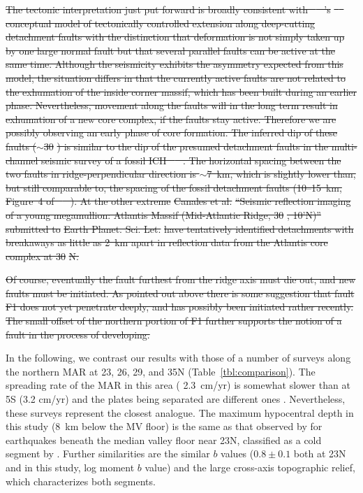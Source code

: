 \documentclass[jgrga]{agu2001} %
\newlength{\tw}
\providecommand{\DIFdel}[1]{{\protect\color{red}\sout{#1}}}                      %
\providecommand{\DIFdelbegin}{} %
\providecommand{\DIFdelend}{} %
\begin{document}
\begin{article}
\DIFdelbegin \DIFdel{The tectonic interpretation just put forward is broadly consistent
with \mbox{%
\citeauthor{tucholke94}
}%
's }%
\DIFdel{\mbox{%
\citeyear{tucholke94}
}%
}%
\DIFdel{conceptual
model of tectonically controlled extension along deep-cutting
detachment faults with the distinction that deformation is
not simply taken up by one large normal fault  but that several
parallel faults can be active at the same time.
Although the seismicity exhibits the asymmetry expected from this
model, the situation differs in that the currently active faults are
not related to the exhumation of the inside corner massif, which has
been built during an earlier phase. Nevertheless, movement along the
faults will in the long term result in exhumation of a new core
complex, if the faults stay active. Therefore we are possibly 
observing an early phase of core formation.
The inferred dip of
these faults ($\sim$30}%
\DIFdel{) is similar to the dip of the presumed
detachment faults in the multi-channel seismic survey of a fossil ICH
\mbox{%
\citep{ranero99}
}%
.  The horizontal spacing between the two faults in
ridge-perpendicular direction is $\sim$7~km, which is slightly lower
than, but still comparable to, the spacing of the fossil detachment
faults (10--15~km, Figure~4 of \mbox{%
\citet{ranero99}
}%
). At the other extreme
}%
\DIFdel{Canales et al.}%
\DIFdel{``Seismic reflection imaging of a young
megamullion: Atlantis Massif (Mid-Atlantic Ridge, 30}%
\DIFdel{, 10'N)'' submitted to }%
\DIFdel{Earth Planet. Sci. Let.}%
\DIFdel{have tentatively identified detachments with breakaways as little as
2~km apart in reflection data from the Atlantis core complex at 30}%
\DIFdel{N.
}\DIFdelend %


\DIFdelbegin \DIFdel{Of course, eventually the fault furthest
from the ridge axis must die out, and new faults must be
initiated. As pointed out above there is some suggestion that fault
F1 does not yet penetrate deeply, and has possibly been initiated
rather recently. The small offset of the northern portion of F1
further supports the notion of a fault in the process of developing.
}%

\DIFdelend In the following, we contrast our results with those of a number of
surveys along the northern MAR at 23\dg, 26\dg, 29\dg,  and 35\dg N (Table~\ref{tbl:comparison}).  The spreading
rate of the MAR in this area ( 2.3~cm/yr) is somewhat slower than
at 5\dg S (3.2 cm/yr) and the plates being separated are different
ones \citep{demets94}.
Nevertheless, these surveys represent the closest analogue.
The maximum hypocentral depth in this study (8~km below the MV
floor) is the same as that
observed by \citet{toomey88} for earthquakes beneath the median valley
floor near 23\dg N, classified as a cold segment by \citet{thibaud98}. Further similarities are the
similar $b$ values ($0.8\pm0.1$ both at 23\dg N and in this
study, log moment $b$ value) and the large cross-axis topographic relief, which
characterizes both segments.


\end{article}
\end{document}
